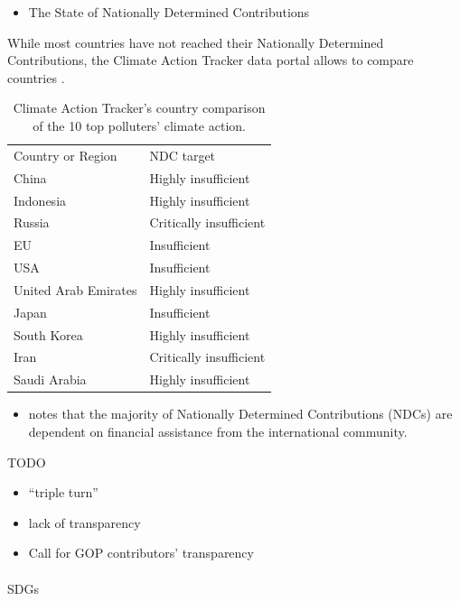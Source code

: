 \documentclass[
  letterpaper,
  DIV=11,
  numbers=noendperiod]{scrartcl}
\makeatletter
\let\oldparagraph\paragraph
\renewcommand{\paragraph}{
    \@ifstar
      \xxxParagraphStar
      \xxxParagraphNoStar
  }
\newcommand{\xxxParagraphStar}[1]{\oldparagraph*{#1}\mbox{}}
\newcommand{\xxxParagraphNoStar}[1]{\oldparagraph{#1}\mbox{}}
\providecommand{\tightlist}{%
  \setlength{\itemsep}{0pt}\setlength{\parskip}{0pt}}\usepackage{longtable,booktabs,array}
\makeatother
\begin{document}
\begin{itemize}
\tightlist
\item
  \citet{unfcccNDC2022} The State of Nationally Determined Contributions
\end{itemize}

While most countries have not reached their Nationally Determined
Contributions, the Climate Action Tracker data portal allows to compare
countries \citep{climateanalyticsClimateActionTracker2023}.

\begin{longtable}[]{@{}ll@{}}
\caption{Climate Action Tracker's country comparison of the 10 top
polluters' climate action.}\tabularnewline
\toprule\noalign{}
\endfirsthead
\endhead
\bottomrule\noalign{}
\endlastfoot
Country or Region & NDC target \\
China & Highly insufficient \\
Indonesia & Highly insufficient \\
Russia & Critically insufficient \\
EU & Insufficient \\
USA & Insufficient \\
United Arab Emirates & Highly insufficient \\
Japan & Insufficient \\
South Korea & Highly insufficient \\
Iran & Critically insufficient \\
Saudi Arabia & Highly insufficient \\
\end{longtable}

\begin{itemize}
\tightlist
\item
  \citet{fransenStateNationallyDetermined2022} notes that the majority
  of Nationally Determined Contributions (NDCs) are dependent on
  financial assistance from the international community.
\end{itemize}

TODO

\begin{itemize}
\tightlist
\item
  ``triple turn''
\item
  lack of transparency
\item
  Call for GOP contributors' transparency
\end{itemize}

\paragraph{SDGs}\label{sdgs}
\end{document}
